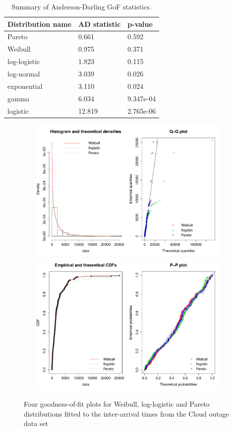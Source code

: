 \begin{table}[!ht]\centering
\caption{Summary of Anderson-Darling GoF statistics.}
\label{tab:chap4tab1}
\begin{tabular}{| C{4cm} | C{4cm} | C{4cm} |} \hline 
\textbf{Distribution name}  & \textbf{AD statistic} & \textbf{p-value}
\\ \hline Pareto & 0.661  & 0.592
\\ \hline Weibull & 0.975 & 0.371
\\ \hline log-logistic & 1.823  & 0.115
\\ \hline log-normal & 3.039  & 0.026 
\\ \hline exponential & 3.110  & 0.024
\\ \hline gamma & 6.034  & 9.347e-04 
\\ \hline logistic & 12.819 & 2.765e-06
\\ \hline
\end{tabular}
\end{table}

\begin{figure}[ht!]\centering
\caption{Four goodness-of-fit plots for Weibull, log-logistic and Pareto distributions fitted to the inter-arrival times from the Cloud outage data set}
\label{fig:chap4fig1}
\includegraphics[width=14cm, height=7cm]{graphs/inter-arrival/Graphs1.pdf}
\includegraphics[width=14cm, height=7cm]{graphs/inter-arrival/Graphs2.pdf}
\end{figure}

